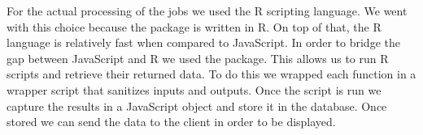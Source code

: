 For the actual processing of the jobs we used the R scripting language. We went with this choice because the  package is written in R. On top of that, the R language is relatively fast when compared to JavaScript. In order to bridge the gap between JavaScript and R we used the  package. This allows us to run R scripts and retrieve their returned data. To do this we wrapped each  function in a wrapper script that sanitizes inputs and outputs. Once the script is run we capture the results in a JavaScript object and store it in the database. Once stored we can send the data to the client in order to be displayed.\par
